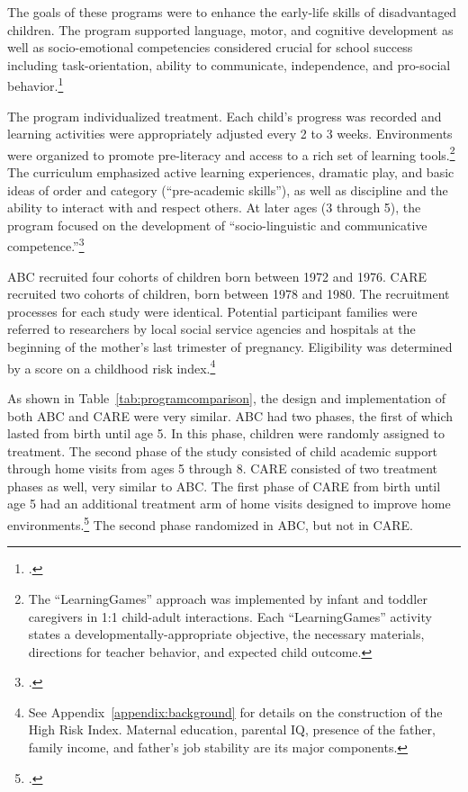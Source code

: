 The goals of these programs were to enhance the early-life skills of disadvantaged children. The program supported language, motor, and cognitive development as well as socio-emotional competencies considered crucial for school success including task-orientation, ability to communicate, independence, and pro-social behavior.\footnote{\citet{Ramey_Collier_etal_1976_CarolinaAbecedarianProject, Ramey_etal_1985_Project-CARE_TiECSE, Sparling_1974_Synth_Edu_Infant_SPEECH, Wasik_Ramey_etal_1990_CD, Ramey-etal_2012-ABC}.}

The program individualized treatment. Each child's progress was recorded and learning activities were appropriately adjusted every 2 to 3 weeks. Environments were organized to promote pre-literacy and access to a rich set of learning tools.\footnote{The ``LearningGames'' approach was implemented by infant and toddler caregivers in 1:1 child-adult interactions. Each ``LearningGames'' activity states a developmentally-appropriate objective, the necessary materials, directions for teacher behavior, and expected child outcome.} The curriculum emphasized active learning experiences, dramatic play, and basic ideas of order and category (``pre-academic skills''), as well as discipline and the ability to interact with and respect others.  At later ages (3 through 5), the program focused on the development of ``socio-linguistic and communicative competence.''\footnote{\citet{Ramey-et-al_1977_Intro-to-ABC, Haskins_1985_CD, Ramey_1981_Modification, Ramey_Campbell_1979_SR, Ramey_Smith_1977_AJMD, Ramey_McGinness_etal_1982_Abecedarianapproach, Sparling_Lewis_1979_BOOKLearninggamesFirstThree,Sparling_Lewis_1984_BOOKLearningGamesThreesFours}.}

ABC recruited four cohorts of children born between 1972 and 1976. CARE recruited two cohorts of children, born between 1978 and 1980. The recruitment processes for each study were identical. Potential participant families were referred to researchers by local social service agencies and hospitals at the beginning of the mother's last trimester of pregnancy. Eligibility was determined by a score on a childhood risk index.\footnote{See Appendix~\ref{appendix:background} for details on the construction of the High Risk Index. Maternal education, parental IQ, presence of the father, family income, and father's job stability are its major components.}

As shown in Table~\ref{tab:programcomparison}, the design and implementation of both ABC and CARE were very similar. ABC had two phases, the first of which lasted from birth until age 5. In this phase, children were randomly assigned to treatment. The second phase of the study consisted of child academic support through home visits from ages 5 through 8. CARE consisted of two treatment phases as well, very similar to ABC. The first phase of CARE from birth until age 5 had an additional treatment arm of home visits designed to improve home environments.\footnote{\citet{Wasik_Ramey_etal_1990_CD}.} The second phase randomized in ABC, but not in CARE.

